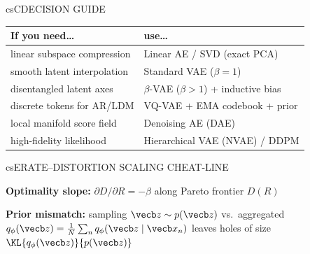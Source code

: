 \documentclass[../../../../master.tex]{subfiles}
\begin{document}
\begin{cscolumns}
\begin{cscard}{csC}{DECISION GUIDE}
  \renewcommand{\arraystretch}{1.22}\small
  \begin{tabular}{@{}>{\raggedright\arraybackslash}p{3.1cm}>{\raggedright\arraybackslash}p{4.6cm}@{}}
    \textbf{If you need\ldots} & \textbf{use\ldots}\\ \hline
    linear subspace compression & Linear AE / SVD (exact PCA)\\
    smooth latent interpolation & Standard VAE ($\beta=1$)\\
    disentangled latent axes & $\beta$-VAE ($\beta>1$) + inductive bias\\
    discrete tokens for AR/LDM & VQ-VAE + EMA codebook + prior\\
    local manifold score field & Denoising AE (DAE)\\
    high-fidelity likelihood & Hierarchical VAE (NVAE) / DDPM\\
  \end{tabular}
\end{cscard}

\begin{cscard}{csE}{RATE--DISTORTION SCALING CHEAT-LINE}
  \begin{csbul}
    \item \textbf{Optimality slope:} $\partial D/\partial R=-\beta$ along Pareto frontier $D(R)$
    \item \textbf{Prior mismatch:} sampling $\vecb z\sim p(\vecb z)$ vs.\ aggregated $q_\phi(\vecb z)=\frac{1}{N}\sum_n q_\phi(\vecb z\mid\vecb x_n)$ leaves holes of size $\KL{q_\phi(\vecb z)}{p(\vecb z)}$
  \end{csbul}
\end{cscard}


\end{cscolumns}
\end{document}
